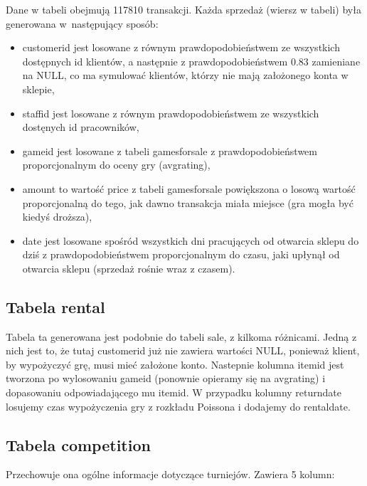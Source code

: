 \documentclass{article}
\begin{document}
		\noindent Dane w tabeli obejmują 117810 transakcji. Każda sprzedaż (wiersz w tabeli) była generowana w~następujący sposób:
		\begin{itemize}
			\setlength{\itemsep}{-2pt}
			\item customer\textunderscore id jest losowane z równym prawdopodobieństwem ze wszystkich dostępnych id klientów, a następnie z prawdopodobieństwem 0.83 zamieniane na NULL, co ma symulować klientów, którzy nie mają założonego konta w sklepie,
			\item staff\textunderscore id jest losowane z równym prawdopodobieństwem ze wszystkich dostęnych id pracowników,
			\item game\textunderscore id jest losowane z tabeli games\textunderscore for\textunderscore sale z prawdopodobieństwem proporcjonalnym do oceny gry (avg\textunderscore rating),
			\item amount to wartość price z tabeli games\textunderscore for\textunderscore sale powiększona o losową wartość proporcjonalną do tego, jak dawno transakcja miała miejsce (gra mogła być kiedyś droższa),
			\item date jest losowane spośród wszystkich dni pracujących od otwarcia sklepu do dziś z prawdopodobieństwem proporcjonalnym do czasu, jaki upłynął od otwarcia sklepu (sprzedaż rośnie wraz z czasem).
		\end{itemize}

	
	\subsection{Tabela rental}
        Tabela ta generowana jest podobnie do tabeli sale, z kilkoma różnicami. Jedną z nich jest to, że tutaj customer\textunderscore id już nie zawiera wartości NULL, ponieważ klient, by wypożyczyć grę, musi mieć założone konto. Nastepnie kolumna item\textunderscore id jest tworzona po wylosowaniu game\textunderscore id (ponownie opieramy się na avg\textunderscore rating) i dopasowaniu odpowiadającego mu item\textunderscore id. W przypadku kolumny return\textunderscore date losujemy czas wypożyczenia gry z rozkładu Poissona i dodajemy do rental\textunderscore date.

	
	\subsection{Tabela competition}

	Przechowuje ona ogólne informacje dotyczące turniejów. Zawiera 5 kolumn:
		
\end{document}
